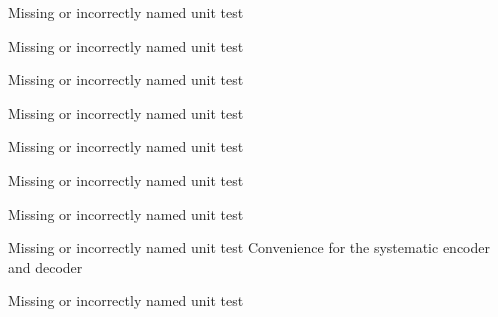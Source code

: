 \begin{DoxyRefList}
\item[\label{todo__todo000057}%
\hypertarget{todo__todo000057}{}%
Class \hyperlink{classkodo_1_1storage__aware__encoder}{kodo\-:\-:storage\-\_\-aware\-\_\-encoder$<$ Super\-Coder $>$} ]Missing or incorrectly named unit test


\item[\label{todo__todo000058}%
\hypertarget{todo__todo000058}{}%
Class \hyperlink{classkodo_1_1storage__aware__generator}{kodo\-:\-:storage\-\_\-aware\-\_\-generator$<$ Super\-Coder $>$} ]Missing or incorrectly named unit test


\item[\label{todo__todo000059}%
\hypertarget{todo__todo000059}{}%
Class \hyperlink{classkodo_1_1storage__block__info}{kodo\-:\-:storage\-\_\-block\-\_\-info$<$ Super\-Coder $>$} ]Missing or incorrectly named unit test


\item[\label{todo__todo000060}%
\hypertarget{todo__todo000060}{}%
Class \hyperlink{classkodo_1_1storage__bytes__used}{kodo\-:\-:storage\-\_\-bytes\-\_\-used$<$ Super\-Coder $>$} ]Missing or incorrectly named unit test


\item[\label{todo__todo000061}%
\hypertarget{todo__todo000061}{}%
Class \hyperlink{classkodo_1_1storage__encoder}{kodo\-:\-:storage\-\_\-encoder$<$ Encoder\-Type, Block\-Partitioning $>$} ]Missing or incorrectly named unit test  
\item[\label{todo__todo000062}%
\hypertarget{todo__todo000062}{}%
Class \hyperlink{classkodo_1_1symbol__id__decoder}{kodo\-:\-:symbol\-\_\-id\-\_\-decoder$<$ Super\-Coder $>$} ]Missing or incorrectly named unit test


\item[\label{todo__todo000063}%
\hypertarget{todo__todo000063}{}%
Class \hyperlink{classkodo_1_1symbol__id__encoder}{kodo\-:\-:symbol\-\_\-id\-\_\-encoder$<$ Super\-Coder $>$} ]Missing or incorrectly named unit test


\item[\label{todo__todo000064}%
\hypertarget{todo__todo000064}{}%
Class \hyperlink{classkodo_1_1systematic__base__coder}{kodo\-:\-:systematic\-\_\-base\-\_\-coder} ]Missing or incorrectly named unit test Convenience for the systematic encoder and decoder  
\item[\label{todo__todo000065}%
\hypertarget{todo__todo000065}{}%
Class \hyperlink{classkodo_1_1systematic__decoder}{kodo\-:\-:systematic\-\_\-decoder$<$ Super\-Coder $>$} ]Missing or incorrectly named unit test



\end{DoxyRefList}
